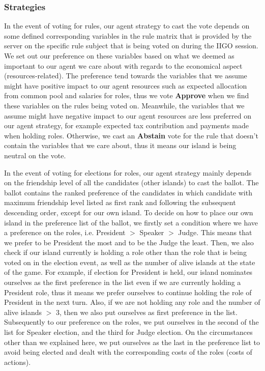 \subsubsection{Strategies} \label{subsubsec:Team6_Voting:Strategies}
In the event of voting for rules, our agent strategy to cast the vote depends on some defined corresponding variables in the rule matrix that is provided by the server on the specific rule subject that is being voted on during the IIGO session. We set out our preference on these variables based on what we deemed as important to our agent we care about with regards to the economical aspect (resources-related). The preference tend towards the variables that we assume might have positive impact to our agent resources such as expected allocation from common pool and salaries for roles, thus we vote \textbf{Approve} when we find these variables on the rules being voted on. Meanwhile, the variables that we assume might have negative impact to our agent resources are less preferred on our agent strategy, for example expected tax contribution and payments made when holding roles. Otherwise, we cast an \textbf{Abstain} vote for the rule that doesn't contain the variables that we care about, thus it means our island is being neutral on the vote.

In the event of voting for elections for roles, our agent strategy mainly depends on the friendship level of all the candidates (other islands) to cast the ballot. The ballot contains the ranked preference of the candidates in which candidate with maximum friendship level listed as first rank and following the subsequent descending order, except for our own island. To decide on how to place our own island in the preference list of the ballot, we firstly set a condition where we have a preference on the roles, i.e. President $>$ Speaker $>$ Judge. This means that we prefer to be President the most and to be the Judge the least. Then, we also check if our island currently is holding a role other than the role that is being voted on in the election event, as well as the number of alive islands at the state of the game. For example, if election for President is held, our island nominates ourselves as the first preference in the list even if we are currently holding a President role, thus it means we prefer ourselves to continue holding the role of President in the next turn. Also, if we are not holding any role and the number of alive islands $>$ 3, then we also put ourselves as first preference in the list. Subsequently to our preference on the roles, we put ourselves in the second of the list for Speaker election, and the third for Judge election. On the circumstances other than we explained here, we put ourselves as the last in the preference list to avoid being elected and dealt with the corresponding costs of the roles (costs of actions).

